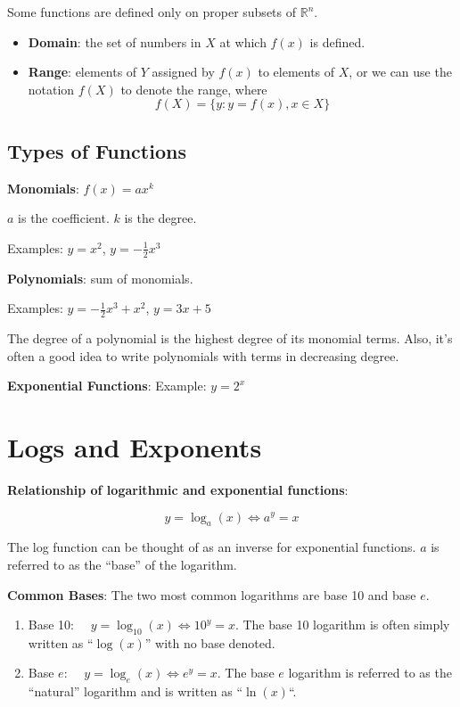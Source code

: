 \documentclass[
  letterpaper,
]{book}
\providecommand{\tightlist}{%
  \setlength{\itemsep}{0pt}\setlength{\parskip}{0pt}}\usepackage{longtable,booktabs,array}
\theoremstyle{definition}
\theoremstyle{definition}
\theoremstyle{plain}
\theoremstyle{definition}
\theoremstyle{plain}
\theoremstyle{plain}
\theoremstyle{remark}
\begin{document}
Some functions are defined only on proper subsets of \(\mathbb{R}^n\).

\begin{itemize}
\tightlist
\item
  \textbf{Domain}: the set of numbers in \(X\) at which \(f(x)\) is
  defined.
\item
  \textbf{Range}: elements of \(Y\) assigned by \(f(x)\) to elements of
  \(X\), or we can use the notation \(f(X)\) to denote the range, where
  \[f(X)=\{ y : y=f(x), x\in X\}\]
\end{itemize}

\hypertarget{types-of-functions}{%
\subsection*{Types of Functions}\label{types-of-functions}}

\textbf{Monomials}: \(f(x)=a x^k\)

\(a\) is the coefficient. \(k\) is the degree.

Examples: \(y=x^2\), \(y=-\frac{1}{2}x^3\)

\textbf{Polynomials}: sum of monomials.

Examples: \(y=-\frac{1}{2}x^3+x^2\), \(y=3x+5\)

The degree of a polynomial is the highest degree of its monomial terms.
Also, it's often a good idea to write polynomials with terms in
decreasing degree.

\textbf{Exponential Functions}: Example: \(y=2^x\)

\hypertarget{logexponents}{%
\section*{Logs and Exponents}\label{logexponents}}

\textbf{Relationship of logarithmic and exponential functions}:

\[
y=\log_a(x) \iff a^y=x
\]

The log function can be thought of as an inverse for exponential
functions. \(a\) is referred to as the ``base'' of the logarithm.

\textbf{Common Bases}: The two most common logarithms are base 10 and
base \(e\).

\begin{enumerate}
\def\labelenumi{\arabic{enumi}.}
\tightlist
\item
  Base 10: \(\quad y=\log_{10}(x) \iff 10^y=x\). The base 10 logarithm
  is often simply written as ``\(\log(x)\)'' with no base denoted.
\item
  Base \(e\): \(\quad y=\log_e(x) \iff e^y=x\). The base \(e\) logarithm
  is referred to as the ``natural'' logarithm and is written as
  ``\(\ln(x)\)``.
\end{enumerate}
\end{document}
